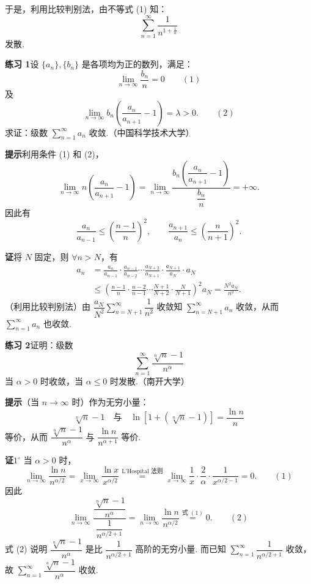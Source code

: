 \documentclass[UTF8, 12pt, fontset=fandol, oneside]{ctexart}
\begin{document}
于是，利用比较判别法，由不等式 (1) 知：
\[
  \sum_{n=1}^\infty\frac1{n^{1+\frac1n}}
\]
发散.

\noindent\textbf{练习 1}\quad 设 $\{a_n\},\{b_n\}$ 是各项均为正的数列，满足：
\[
  \lim_{n\to\infty}\frac{b_n}{n}=0
\qquad(1)
\]
及
\[
  \lim_{n\to\infty} b_n\left(\frac{a_n}{a_{n+1}}-1\right)=\lambda>0.
\qquad(2)
\]
求证：级数 $\displaystyle\sum_{n=1}^\infty a_n$ 收敛.（中国科学技术大学）

\noindent\textbf{提示}\quad 利用条件 (1) 和 (2)，
\[
  \lim_{n\to\infty}n\left(\frac{a_n}{a_{n+1}}-1\right)
  =\lim_{n\to\infty}
  \frac{b_n\left(\dfrac{a_n}{a_{n+1}}-1\right)}{\dfrac{b_n}{n}}
  =+\infty.
\]
因此有
\[
  \frac{a_n}{a_{n-1}}\le\left(\frac{n-1}{n}\right)^2,\qquad
  \frac{a_{n+1}}{a_n}\le\left(\frac n{n+1}\right)^2.
\]

\noindent\textbf{证}\quad 将 $N$ 固定，则 $\forall n>N$，有
\[
\begin{aligned}
a_n
&=\frac{a_n}{a_{n-1}}\cdot\frac{a_{n-1}}{a_{n-2}}\cdots
  \frac{a_{N+2}}{a_{N+1}}\cdot\frac{a_{N+1}}{a_N}\cdot a_N\\
&\le\left(\frac{n-1}{n}\cdot\frac{n-2}{n-1}\cdots
  \frac{N+1}{N+2}\cdot\frac N{N+1}\right)^2a_N
=\frac{N^2a_N}{n^2}.
\end{aligned}
\]
（利用比较判别法）由 $\dfrac{a_N}{N^2}\sum_{n=N+1}^\infty\dfrac1{n^2}$ 收敛知 $\displaystyle\sum_{n=N+1}^\infty a_n$ 收敛，从而 $\displaystyle\sum_{n=1}^\infty a_n$ 也收敛.

\noindent\textbf{练习 2}\quad 证明：级数
\[
  \sum_{n=1}^\infty\frac{\sqrt[n]{n}-1}{n^\alpha}
\]
当 $\alpha>0$ 时收敛，当 $\alpha\le0$ 时发散.（南开大学）

\noindent\textbf{提示}\quad （当 $n\to\infty$ 时）作为无穷小量：
\[
  \sqrt[n]{n}-1
  \quad\text{与}\quad
  \ln[1+(\sqrt[n]{n}-1)]=\frac{\ln n}{n}
\]
等价，从而 $\dfrac{\sqrt[n]{n}-1}{n^\alpha}$ 与 $\dfrac{\ln n}{n^{\alpha+1}}$ 等价.

\noindent\textbf{证}\quad $1^\circ$ 当 $\alpha>0$ 时，
\[
  \lim_{n\to\infty}\frac{\ln n}{n^{\alpha/2}}
  =\lim_{x\to\infty}\frac{\ln x}{x^{\alpha/2}}
  \stackrel{\text{L'Hospital 法则}}{=}
  \lim_{x\to\infty}\frac1x\cdot\frac2\alpha\cdot\frac1{x^{\alpha/2-1}}=0.
\qquad(1)
\]
因此
\[
  \lim_{n\to\infty}
  \frac{\dfrac{\sqrt[n]{n}-1}{n^\alpha}}{\dfrac1{n^{\alpha/2+1}}}
  =\lim_{n\to\infty}\frac{\ln n}{n^{\alpha/2}}
  \stackrel{\text{式 }(1)}{=}0.
\qquad(2)
\]
式 (2) 说明 $\dfrac{\sqrt[n]{n}-1}{n^\alpha}$ 是比 $\dfrac1{n^{\alpha/2+1}}$ 高阶的无穷小量. 而已知 $\displaystyle\sum_{n=1}^\infty\dfrac1{n^{\alpha/2+1}}$ 收敛，故 $\displaystyle\sum_{n=1}^\infty\dfrac{\sqrt[n]{n}-1}{n^\alpha}$ 收敛.
\end{document}
